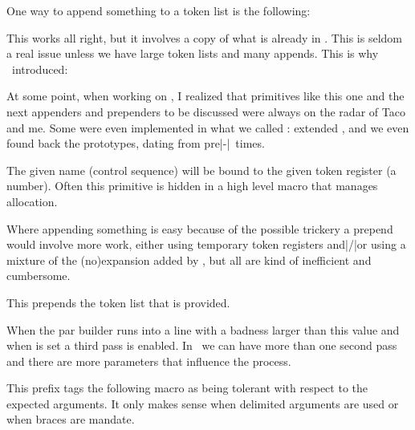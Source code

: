 One way to append something to a token list is the following:

\starttyping
\scratchtoks\expandafter{\the\scratchtoks more stuff}
\stoptyping

This works all right, but it involves a copy of what is already in \type
{\scratchtoks}. This is seldom a real issue unless we have large token lists and
many appends. This is why \LUATEX\ introduced:

\starttyping
\toksapp{}
\toksapp\scratchtoksone\scratchtokstwo
\stoptyping

At some point, when working on \LUAMETATEX, I realized that primitives like this
one and the next appenders and prependers to be discussed were always on the
radar of Taco and me. Some were even implemented in what we called :
extended \ETEX, and we even found back the prototypes, dating from pre|-|\PDFTEX\
times.

\stopnewprimitive

\startoldprimitive[title={\prm {toksdef}}]

The given name (control sequence) will be bound to the given token register (a
number). Often this primitive is hidden in a high level macro that manages
allocation.

\stopoldprimitive

\startnewprimitive[title={\prm {tokspre}}]

Where appending something is easy because of the possible 
trickery a prepend would involve more work, either using temporary token
registers and|/|or using a mixture of the (no)expansion added by \ETEX, but all
are kind of inefficient and cumbersome.

\starttyping
\tokspre{}
\tokspre\scratchtoksone\scratchtokstwo
\stoptyping

This prepends the token list that is provided.

\stopnewprimitive

\startoldprimitive[title={\prm {tolerance}}]

When the par builder runs into a line with a badness larger than this value and
when \prm {emergencystretch} is set a third pass is enabled. In \LUAMETATEX\ we
can have more than one second pass and there are more parameters that influence
the process.

\stopoldprimitive

\startnewprimitive[title={\prm {tolerant}}]

This prefix tags the following macro as being tolerant with respect to the
expected arguments. It only makes sense when delimited arguments are used or when
braces are mandate.

